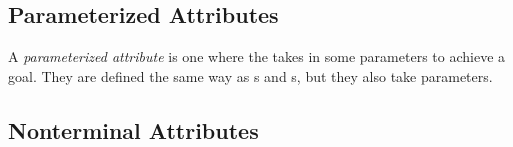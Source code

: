 \subsection{Parameterized Attributes}\label{subsec:Parameterized_Attributes}
\begin{definition}\label{def:Parameterized_Attribute}
  A \emph{parameterized attribute} is one where the  takes in some parameters to achieve a  goal.
  They are defined the same way as s and s, but they also take parameters.
\end{definition}

\subsection{Nonterminal Attributes}\label{subsec:Nonterminal_Attributes}
